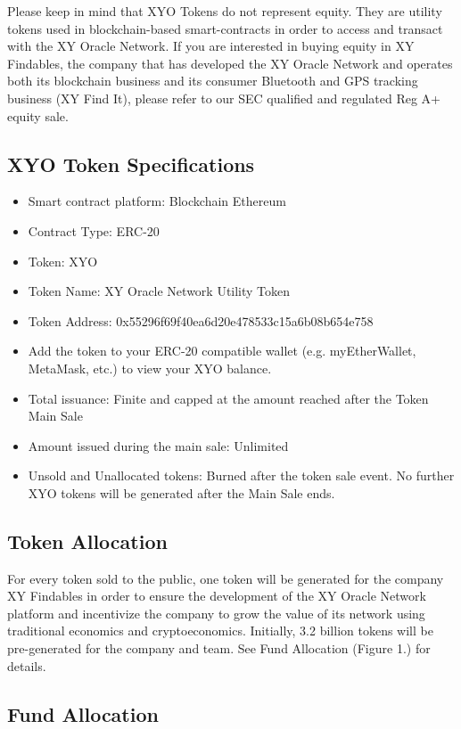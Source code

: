 \documentclass{article}
\begin{document}
Please keep in mind that XYO Tokens do not represent equity. They are utility tokens used in blockchain-based \glspl{smart-contract} in order to access and transact with the XY Oracle Network. If you are interested in buying equity in XY Findables, the company that has developed the XY Oracle Network and operates both its blockchain business and its consumer Bluetooth and GPS tracking business (XY Find It), please refer to our SEC qualified and regulated Reg A+ equity sale.


\subsection {XYO Token Specifications}
\begin{itemize}
\item Smart contract platform: Blockchain Ethereum
\item Contract Type: ERC-20
\item Token: XYO
\item Token Name: XY Oracle Network Utility Token
\item Token Address: 0x55296f69f40ea6d20e478533c15a6b08b654e758
\item Add the token to your ERC-20 compatible wallet (e.g. myEtherWallet, MetaMask, etc.) to view your XYO balance.
\item Total issuance: Finite and capped at the amount reached after the Token Main Sale
\item Amount issued during the main sale: Unlimited
\item Unsold and Unallocated tokens: Burned after the token sale event. No further XYO tokens will be generated after the Main Sale ends.
\end{itemize}

\subsection {Token Allocation}
For every token sold to the public, one token will be generated for the company XY Findables in order to ensure the development of the XY Oracle Network platform and incentivize the company to grow the value of its network using traditional economics and \gls{cryptoeconomics}.
Initially, 3.2 billion tokens will be pre-generated for the company and team. See Fund Allocation (Figure 1.) for details.
\clearpage

\subsection {Fund Allocation}
\end{document}
